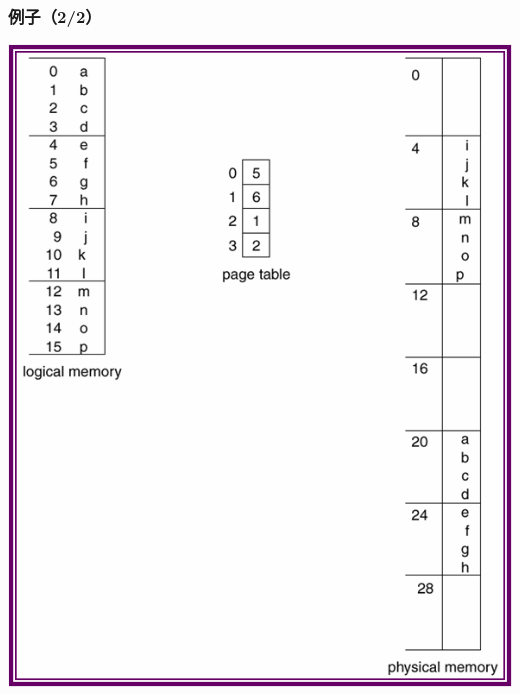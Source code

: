 \documentclass[CJKutf8,xcolor=pdftex,dvipsnames,table]{beamer}
\begin{document}
\begin{CJK*}{UTF8}{song}
  \begin{frame}
  \frametitle{例子（2/2）} \pause
  \begin{center}
    \includegraphics[scale=.6]{v6f9-8}
  \end{center}
  \end{frame}
  

\end{CJK*}
\end{document}
